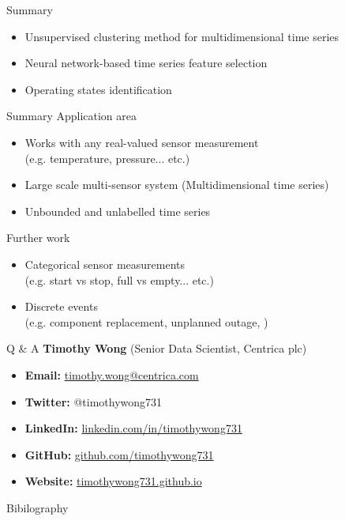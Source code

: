 \documentclass{beamer}
\begin{document}
\begin{frame}{Summary}
  \begin{itemize}
    \item Unsupervised clustering method for multidimensional time series
    \item Neural network-based time series feature selection
    \item Operating states identification
  \end{itemize}
\end{frame}

\begin{frame}{Summary}
  Application area
    \begin{itemize}
      \item Works with any real-valued sensor measurement 
        \\ (e.g. temperature, pressure... etc.)
      \item Large scale multi-sensor system (Multidimensional time series)
      \item Unbounded and unlabelled time series
    \end{itemize}
  Further work
    \begin{itemize}
      \item Categorical sensor measurements 
        \\(e.g. start vs stop, full vs empty... etc.)
      \item Discrete events 
        \\(e.g. component replacement, unplanned outage, )
    \end{itemize}
\end{frame}

\begin{frame}{Q \& A}
\textbf{Timothy Wong} (Senior Data Scientist, Centrica plc)
  \begin{itemize}
    \item \textbf{Email:} \url{timothy.wong@centrica.com}
    \item \textbf{Twitter:} @timothywong731
    \item \textbf{LinkedIn:} \url{linkedin.com/in/timothywong731}
    \item \textbf{GitHub:} \url{github.com/timothywong731}
    \item \textbf{Website:} \url{timothywong731.github.io}
  \end{itemize}
\end{frame}

\begin{frame}[allowframebreaks]{Bibilography}
  
  
\end{frame}
\end{document}
